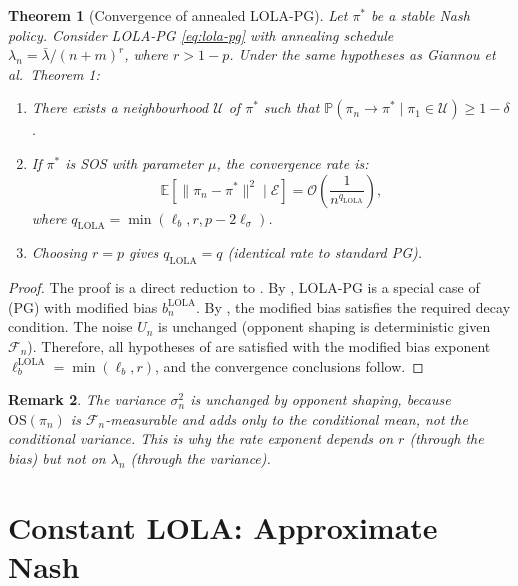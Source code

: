 \documentclass[11pt,a4paper]{article}
\newtheorem{theorem}{Theorem}[section]
\newtheorem{remark}[theorem]{Remark}
\newcommand{\E}{\mathbb{E}}
\newcommand{\Prob}{\mathbb{P}}
\newcommand{\cF}{\mathcal{F}}
\newcommand{\cU}{\mathcal{U}}
\newcommand{\cE}{\mathcal{E}}
\begin{document}
\begin{theorem}[Convergence of annealed LOLA-PG]
\label{thm:annealed}
Let $\pi^*$ be a stable Nash policy. Consider LOLA-PG \eqref{eq:lola-pg} with annealing schedule $\lambda_n = \bar{\lambda}/(n+m)^r$, where $r > 1 - p$. Under the same hypotheses as Giannou et al.\ Theorem 1:
\begin{enumerate}[(1)]
    \item There exists a neighbourhood $\cU$ of $\pi^*$ such that $\Prob(\pi_n \to \pi^* \mid \pi_1 \in \cU) \geq 1 - \delta$.

    \item If $\pi^*$ is SOS with parameter $\mu$, the convergence rate is:
    \begin{equation}
    \label{eq:rate-lola}
        \E[\|\pi_n - \pi^*\|^2 \mid \cE] = \mathcal{O}\!\left(\frac{1}{n^{q_{\mathrm{LOLA}}}}\right),
    \end{equation}
    where $q_{\mathrm{LOLA}} = \min(\ell_b, r, p - 2\ell_\sigma)$.

    \item Choosing $r = p$ gives $q_{\mathrm{LOLA}} = q$ (identical rate to standard PG).
\end{enumerate}
\end{theorem}

\begin{proof}
The proof is a direct reduction to \cite[Theorem 1]{giannou2022}. By , LOLA-PG is a special case of (PG) with modified bias $b_n^{\mathrm{LOLA}}$. By , the modified bias satisfies the required decay condition. The noise $U_n$ is unchanged (opponent shaping is deterministic given $\cF_n$). Therefore, all hypotheses of \cite[Theorem 1]{giannou2022} are satisfied with the modified bias exponent $\ell_b^{\mathrm{LOLA}} = \min(\ell_b, r)$, and the convergence conclusions follow.
\end{proof}

\begin{remark}
The variance $\sigma_n^2$ is \emph{unchanged} by opponent shaping, because $\mathrm{OS}(\pi_n)$ is $\cF_n$-measurable and adds only to the conditional mean, not the conditional variance. This is why the rate exponent depends on $r$ (through the bias) but not on $\lambda_n$ (through the variance).
\end{remark}


\section{Constant LOLA: Approximate Nash}
\label{sec:constant}
\end{document}
